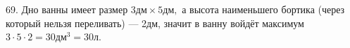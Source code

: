 69. Дно ванны имеет размер $3\text{дм}\times5\text{дм},$ а высота наименьшего бортика (через который нельзя переливать) --- 2дм, значит в ванну войдёт максимум $3\cdot5\cdot2=30\text{дм}^3=30$л.\\
